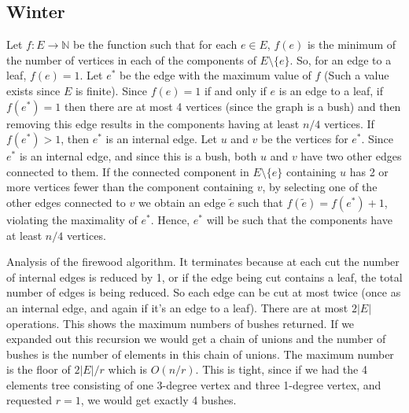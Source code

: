 \documentclass{article}
\theoremstyle{plain}
\theoremstyle{normal}
\begin{document}
        \subsection{Winter}
            Let $f:E\rightarrow\mathbb{N}$ be the function such that for each
            $e\in{E}$, $f(e)$ is the minimum of the number of vertices in each
            of the components of $E\setminus\{e\}$. So, for an edge to a leaf,
            $f(e)=1$. Let $e^{*}$ be the edge with the maximum value of $f$
            (Such a value exists since $E$ is finite). Since $f(e)=1$ if and
            only if $e$ is an edge to a leaf, if $f(e^{*})=1$ then there are
            at most 4 vertices (since the graph is a bush) and then removing
            this edge results in the components having at least $n/4$ vertices.
            If $f(e^{*})>1$, then $e^{*}$ is an internal edge. Let $u$ and
            $v$ be the vertices for $e^{*}$. Since $e^{*}$ is an internal edge,
            and since this is a bush, both $u$ and $v$ have two other edges
            connected to them. If the connected component in $E\setminus\{e\}$
            containing $u$ has 2 or more vertices fewer than the
            component containing $v$, by selecting one of the other edges
            connected to $v$ we obtain an edge $\tilde{e}$ such that
            $f(\tilde{e})=f(e^{*})+1$, violating the maximality of $e^{*}$.
            Hence, $e^{*}$ will be such that the components have at least
            $n/4$ vertices.
            \par\hfill\par
            Analysis of the firewood algorithm. It terminates because at
            each cut the number of internal edges is reduced by 1, or if the
            edge being cut contains a leaf, the total number of edges is
            being reduced. So each edge can be cut at most twice (once as an
            internal edge, and again if it's an edge to a leaf). There are at
            most $2|E|$ operations. This shows the maximum numbers of bushes
            returned. If we expanded out this recursion we would get a chain
            of unions and the number of bushes is the number of elements in
            this chain of unions. The maximum number is the floor of
            $2|E|/r$ which is $O(n/r)$. This is tight, since if we had the
            4 elements tree consisting of one 3-degree vertex and three
            1-degree vertex, and requested $r=1$, we would get exactly 4
            bushes.
\end{document}
